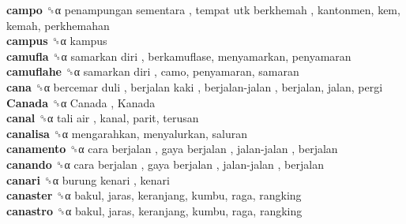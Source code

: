 \textbf{campo} ␝α   penampungan sementara ,  tempat utk berkhemah , kantonmen, kem, kemah, perkhemahan  \\
\textbf{campus} ␝α  kampus  \\
\textbf{camufla} ␝α   samarkan diri , berkamuflase, menyamarkan, penyamaran  \\
\textbf{camuflahe} ␝α   samarkan diri , camo, penyamaran, samaran  \\
\textbf{cana} ␝α   bercemar duli ,  berjalan kaki ,  berjalan-jalan , berjalan, jalan, pergi  \\
\textbf{Canada} ␝α   Canada ,  Kanada   \\
\textbf{canal} ␝α   tali air , kanal, parit, terusan  \\
\textbf{canalisa} ␝α  mengarahkan, menyalurkan, saluran  \\
\textbf{canamento} ␝α   cara berjalan ,  gaya berjalan ,  jalan-jalan , berjalan  \\
\textbf{canando} ␝α   cara berjalan ,  gaya berjalan ,  jalan-jalan , berjalan  \\
\textbf{canari} ␝α   burung kenari , kenari  \\
\textbf{canaster} ␝α  bakul, jaras, keranjang, kumbu, raga, rangking  \\
\textbf{canastro} ␝α  bakul, jaras, keranjang, kumbu, raga, rangking  \\
